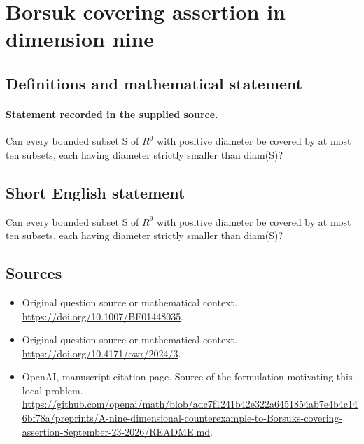 \documentclass[11pt]{article}
\begin{document}
\section*{Borsuk covering assertion in dimension nine}\label{30007080}
\subsection{Definitions and mathematical statement}
\paragraph{Statement recorded in the supplied source.}
Can every bounded subset S of $R^9$ with positive diameter be covered by at most ten subsets, each having diameter strictly smaller than diam(S)?
\subsection{Short English statement}
Can every bounded subset S of $R^9$ with positive diameter be covered by at most ten subsets, each having diameter strictly smaller than diam(S)?
\subsection{Sources}
\begin{itemize}
\item[S1] Original question source or mathematical context.
\url{https://doi.org/10.1007/BF01448035}.
\item[S2] Original question source or mathematical context.
\url{https://doi.org/10.4171/owr/2024/3}.
\item[S3] OpenAI, manuscript citation page. Source of the formulation motivating this local problem.
\url{https://github.com/openai/math/blob/adc7f1241b42e322a6451854ab7e4b4c146bf78a/preprints/A-nine-dimensional-counterexample-to-Borsuks-covering-assertion-September-23-2026/README.md}.
\end{itemize}
\end{document}
